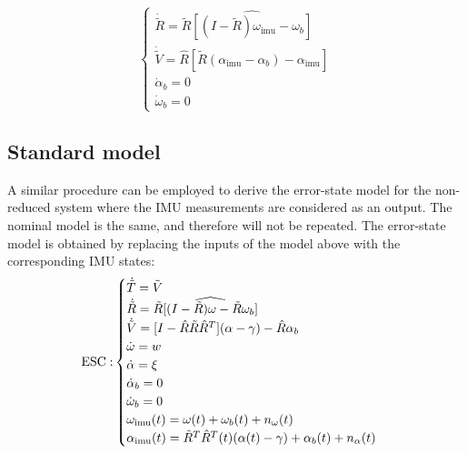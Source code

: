\documentclass[]{article}
\def\w{\omega}
\def\imu{_\mathrm{imu}}
\begin{document}
{\begin{equation}
\begin{cases}
\dot{\tilde R} = \tilde R  \widehat{[(I- \tilde R) \w\imu  - \w_b]} \\
\dot{\tilde V} = \hat R[ \tilde R(\alpha\imu  - \alpha_b) - \alpha\imu ] \\
\dot \alpha_b = 0 \\
\dot \w_b = 0
\end{cases}
\end{equation}
%
\subsection{Standard  model}
%
A similar procedure can be employed to derive the error-state model for the non-reduced system where the IMU measurements are considered as an output. The nominal model is the same, and therefore will not be repeated. The error-state model is obtained by replacing the inputs of the model above with the corresponding IMU states:
\begin{equation}
{\rm ESC:}
\begin{cases}
\dot{\tilde T} = \tilde V \\
\dot{\tilde R} = \tilde R \widehat{[(I - \tilde R)\w - \tilde R \w_b]}  \\
\dot{\tilde V} =[I - \hat R \tilde R {\hat R}^T] (\alpha - \gamma) - \hat R \alpha_b \\
\dot \w = w \\ 
\dot \alpha = \xi \\
\dot \alpha_b = 0 \\
\dot \w_b = 0 \\
\w\imu (t) = \w(t) + \w_b(t) + n_{\w}(t) \\ 
\alpha\imu (t) = {\tilde R}^T {\hat R}^T(t) (\alpha(t)- \gamma) + \alpha_b(t) + n_{\alpha}(t) 
\end{cases}
\end{equation}
%
}
\end{document}
